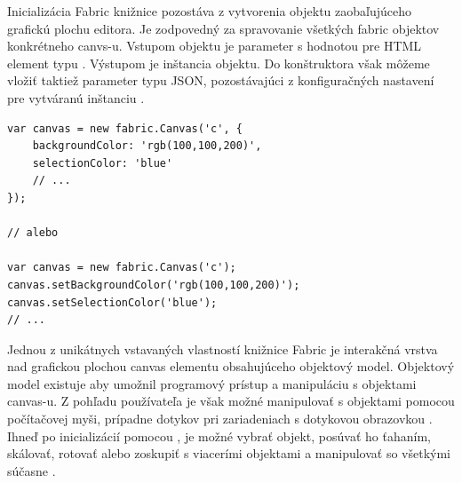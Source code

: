 Inicializácia Fabric knižnice pozostáva z vytvorenia  objektu zaobaľujúceho grafickú plochu editora. Je zodpovedný za spravovanie všetkých fabric objektov konkrétneho canvs-u. Vstupom objektu je parameter s hodnotou  pre HTML element typu . Výstupom je inštancia  objektu. Do konštruktora však môžeme vložiť taktiež parameter typu JSON, pozostávajúci z konfiguračných nastavení pre vytváranú inštanciu . 
\begin{lstlisting}[style=web,caption={Inicializácia Fabric canvas wrappera},captionpos=b, label={lst:fabric.init}]
var canvas = new fabric.Canvas('c', {
	backgroundColor: 'rgb(100,100,200)',
	selectionColor: 'blue'
	// ...
});

// alebo

var canvas = new fabric.Canvas('c');
canvas.setBackgroundColor('rgb(100,100,200)');
canvas.setSelectionColor('blue');
// ...
\end{lstlisting}
Jednou z unikátnych vstavaných vlastností knižnice Fabric je interakčná vrstva nad grafickou plochou canvas elementu obsahujúceho objektový model. Objektový model existuje aby umožnil programový prístup a manipuláciu s objektami canvas-u. Z pohľadu používateľa je však možné manipulovať s objektami pomocou počítačovej myši, prípadne dotykov pri zariadeniach s dotykovou obrazovkou . Ihneď po inicializácií pomocou , je možné vybrať objekt, posúvať ho ťahaním, skálovať, rotovať alebo zoskupiť s viacerími objektami a manipulovať so všetkými súčasne .  

